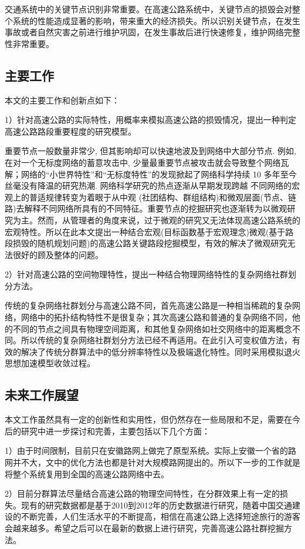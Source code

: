 
	交通系统中的关键节点识别非常重要。在高速公路系统中，关键节点的损毁会对整个系统的性能造成显著的影响，带来重大的经济损失。所以识别关键节点，在发生事故或者自然灾害之前进行维护巩固，在发生事故后进行快速修复，维护网络完整性非常重要。

	\subsection{主要工作}
		本文的主要工作和创新点如下：

		1）针对高速公路的实际特性，用概率来模拟高速公路的损毁情况，提出一种判定高速公路路段重要程度的研究模型。

			重要节点一般数量非常少, 但其影响却可以快速地波及到网络中大部分节点. 例如, 在对一个无标度网络的蓄意攻击中, 少量最重要节点被攻击就会导致整个网络瓦解；网络的“小世界特性”和“无标度特性”的发现掀起了网络科学持续 10 多年至今丝毫没有降温的研究热潮. 网络科学研究的热点逐渐从早期发现跨越 不同网络的宏观上的普适规律转变为着眼于从中观 (社团结构、群组结构)和微观层面(节点、链路)去解释不同网络所具有的不同特征。重要节点的挖掘研究也逐渐转为以微观研究为主。然而，从管理者的角度来说，过于微观的研究又无法体现高速公路系统的宏观特性。所以在此本文提出一种结合宏观(目标函数基于宏观理念)微观(基于路段损毁的随机规划问题)的高速公路关键路段挖掘模型，有效的解决了微观研究无法很好的顾及整体的问题。

		2）针对高速公路的空间物理特性，提出一种结合物理网络特性的复杂网络社群划分方法。

			传统的复杂网络社群划分与高速公路不同，首先高速公路是一种相当稀疏的复杂网络，网络中的拓扑结构特性不是很复杂；其次高速公路和普通的复杂网络不同，他的不同的节点之间具有物理空间距离，和其他复杂网络如社交网络中的距离概念不同。所以传统的复杂网络社群划分方法已经不再适用。在此引入可变权值方法，有效的解决了传统分群算法中的低分辨率特性以及极端退化特性。同时采用模拟退火思想加速模型收敛过程。
	\subsection{未来工作展望}

		本文工作虽然具有一定的创新性和实用性，但仍然存在一些局限和不足，需要在今后的研究中进一步探讨和完善，主要包括以下几个方面：

		1）由于时间限制，目前只在安徽路网上做完了原型系统。实际上安徽一个省的路网并不大，文中的优化方法也都是针对大规模路网提出的。所以下一步的工作就是将整个系统复用到全国的高速公路网络中去。

		2）目前分群算法尽量结合高速公路的物理空间特性，在分群效果上有一定的损失。现有的研究数据都是基于2010到2012年的历史数据进行研究，随着中国交通建设的不断完善，人们生活水平的不断提高，相信在高速公路上选择短途旅行的游客会越来越多。希望之后可以在最新的数据上进行研究，完善高速公路社群挖掘方法。


